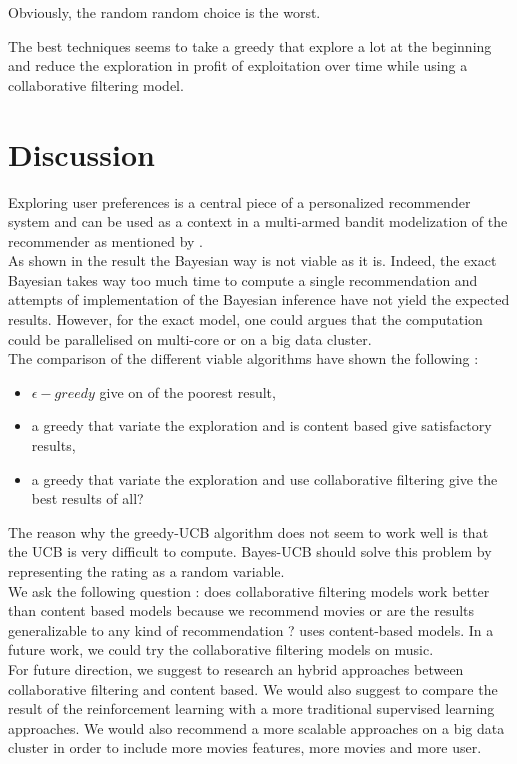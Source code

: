 \documentclass[letterpaper]{article}
\begin{document}
Obviously, the random random choice is the worst.

The best techniques seems to take a greedy that explore a lot at the beginning and reduce the exploration in profit of exploitation over time while using a collaborative filtering model.

\section{Discussion}

Exploring user preferences is a central piece of a personalized recommender system and can be used as a context in a multi-armed bandit modelization of the recommender as mentioned by \cite{main}.\\

As shown in the result the Bayesian way is not viable as it is. Indeed, the exact Bayesian takes way too much time to compute a single recommendation and attempts of implementation of the Bayesian inference have not yield the expected results. However, for the exact model, one could argues that the computation could be parallelised on multi-core or on a big data cluster.\\

The comparison of the different viable algorithms have shown the following : 
\begin{itemize}
	\item $\epsilon-greedy$ give on of the poorest result,
	\item a greedy that variate the exploration and is content based give satisfactory results,
	\item a greedy that variate the exploration and use collaborative filtering give the best results of all?
\end{itemize}

The reason why the greedy-UCB algorithm does not seem to work well is that the UCB is very difficult to compute. Bayes-UCB should solve this problem by representing the rating as a random variable.\\

We ask the following question : does collaborative filtering models work better than content based models because we recommend movies or are the results generalizable to any kind of recommendation ? \cite{main} uses content-based models. In a future work, we could try the collaborative filtering models on music.\\

For future direction, we suggest to research an hybrid approaches between collaborative filtering and content based. We would also suggest to compare the result of the reinforcement learning with a more traditional supervised learning approaches. We would also recommend a more scalable approaches on a big data cluster in order to include more movies features, more movies and more user.
\end{document}
